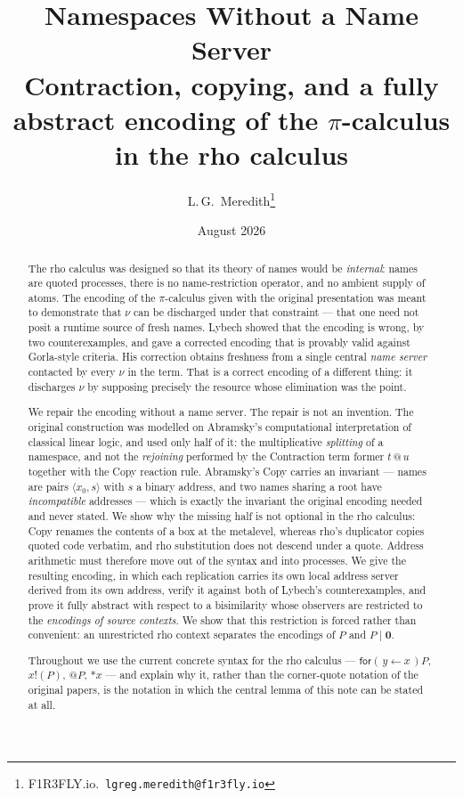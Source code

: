 \documentclass[11pt]{article}
\title{\textbf{Namespaces Without a Name Server}\\[4pt]
\large Contraction, copying, and a fully abstract encoding of the
$\pi$-calculus in the rho calculus}
\author{L.\,G.\ Meredith\thanks{F1R3FLY.io.\ \texttt{lgreg.meredith@f1r3fly.io}}}
\date{August 2026}
\makeatletter
\theoremstyle{definition}
\theoremstyle{plain}
\theoremstyle{remark}
\newcommand{\quo}[1]{@#1}
\newcommand{\drp}[1]{{*}#1}
\newcommand{\inp}[3]{\mathsf{for}(\,#1 \leftarrow #2\,)#3}
\newcommand{\out}[2]{#1!(#2)}
\newcommand{\nil}{\mathbf{0}}
\makeatother
\begin{document}
\maketitle

\begin{abstract}
\noindent
The rho calculus was designed so that its theory of names would be
\emph{internal}: names are quoted processes, there is no name-restriction
operator, and no ambient supply of atoms. The encoding of the
$\pi$-calculus given with the original presentation was meant to
demonstrate that $\nu$ can be discharged under that constraint --- that
one need not posit a runtime source of fresh names. Lybech showed that
the encoding is wrong, by two counterexamples, and gave a corrected
encoding that is provably valid against Gorla-style criteria. His
correction obtains freshness from a single central \emph{name server}
contacted by every $\nu$ in the term. That is a correct encoding of a
different thing: it discharges $\nu$ by supposing precisely the resource
whose elimination was the point.

We repair the encoding without a name server. The repair is not an
invention. The original construction was modelled on Abramsky's
computational interpretation of classical linear logic, and used only
half of it: the multiplicative \emph{splitting} of a namespace, and not
the \emph{rejoining} performed by the Contraction term former $t \mathbin{@} u$
together with the Copy reaction rule. Abramsky's Copy carries an
invariant --- names are pairs $\langle x_0, s\rangle$ with $s$ a binary
address, and two names sharing a root have \emph{incompatible} addresses
--- which is exactly the invariant the original encoding needed and never
stated. We show why the missing half is not optional in the rho calculus:
Copy renames the contents of a box at the metalevel, whereas rho's
duplicator copies quoted code verbatim, and rho substitution does not
descend under a quote. Address arithmetic must therefore move out of the
syntax and into processes. We give the resulting encoding, in which each
replication carries its own local address server derived from its own
address, verify it against both of Lybech's counterexamples, and prove it
fully abstract with respect to a bisimilarity whose observers are
restricted to the \emph{encodings of source contexts}. We show that this
restriction is forced rather than convenient: an unrestricted rho context
separates the encodings of $P$ and $P \mid \nil$.

Throughout we use the current concrete syntax for the rho calculus ---
$\inp{y}{x}{P}$, $\out{x}{P}$, $\quo{P}$, $\drp{x}$ --- and explain why
it, rather than the corner-quote notation of the original papers, is the
notation in which the central lemma of this note can be stated at all.
\end{abstract}
\end{document}
